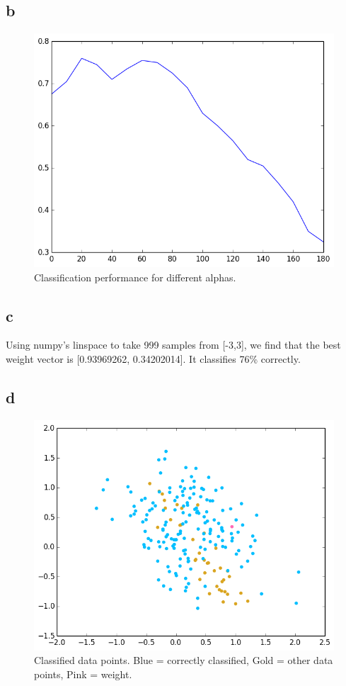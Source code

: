 \documentclass[11pt,a4paper]{article}
\begin{document}
\subsection*{b}
\begin{figure}[h]
\centering
 \includegraphics[width=\textwidth]{./2_2_b.png}
\caption{Classification performance for different alphas.}
\end{figure}

\subsection*{c}
Using numpy's linspace to take 999 samples from [-3,3], we find that the best weight vector is [0.93969262, 0.34202014].  It classifies 76\% correctly.

\subsection*{d}
\begin{figure}[h]
\centering
 \includegraphics[width=\textwidth]{./2_2_d.png}
\caption{Classified data points. Blue = correctly classified, Gold = other data points, Pink = weight.}
\end{figure}
\end{document}

